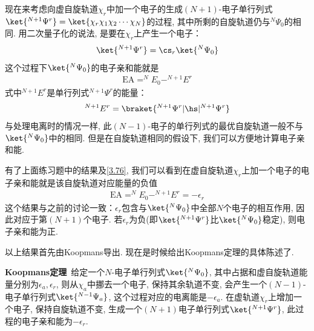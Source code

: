 
现在来考虑向虚自旋轨道$\chi_r$中加一个电子的生成$(N+1)$-电子单行列式$\ket{^{N+1}\Psi^r}=\ket{\chi_r\chi_1\chi_2\cdots\chi_N}$的过程, 
其中所剩的自旋轨道仍与$^N\Psi_0$的相同. 
用二次量子化的说法, 
是要在$\chi_r$上产生一个电子：
\begin{align}
	\ket{^{N+1}\Psi^r} = \cs_r\ket{^N\Psi_0}
\end{align}
这个过程下$\ket{^N\Psi_0}$的电子亲和能就是
\begin{align}
	\mathrm{EA} = ^NE_0 - ^{N+1}E^r
\end{align}
式中$ ^{N+1}E^r$是单行列式$^{N+1}\Psi^r$的能量：
\begin{align}
	^{N+1}E^r = \braket{^{N+1}\Psi^r|\hs|^{N+1}\Psi^r}
\end{align}
与处理电离时的情况一样, 
此$(N-1)$-电子的单行列式的最优自旋轨道一般不与$\ket{^N\Psi_0}$中的相同. 
但是在自旋轨道相同的假设下, 
我们可以方便地计算电子亲和能.


有了上面练习题中的结果及\autoref{3.76}, 
我们可以看到在虚自旋轨道$\chi_r$上加一个电子的电子亲和能就是该自旋轨道对应能量的负值
\begin{align}
	\mathrm{EA} = ^{N}E_0 - ^{N+1}E^r = -\epsilon_r
\end{align}
这个结果与之前的讨论一致：$\epsilon_r$包含与$\ket{^N\Psi_0}$中全部$N$个电子的相互作用, 
因此对应于第$(N+1)$个电子. 
若$\epsilon_r$为负(即$\ket{^{N+1}\Psi^r}$比$\ket{^N\Psi_0}$稳定), 
则电子亲和能为正.


以上结果首先由Koopmans导出. 
现在是时候给出Koopmans定理的具体陈述了.


\textbf{Koopmans定理}\ 给定一个$N$-电子\hft 单行列式$\ket{^N\Psi_0}$, 其中占据和虚自旋轨道能量分别为$\epsilon_a,\epsilon_r$, 则从$\chi_a$中挪去一个电子, 保持其余轨道不变, 会产生一个$(N-1)$-电子单行列式$\ket{^{N-1}\Psi_a}$, 这个过程对应的电离能是$-\epsilon_a$. 
在虚轨道$\chi_r$上增加一个电子, 保持自旋轨道不变, 生成一个$(N+1)$电子单行列式$\ket{^{N+1}\Psi^r}$, 此过程的电子亲和能为$-\epsilon_r$.


